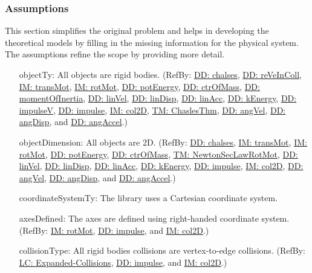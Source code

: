 \documentclass[12pt]{article}
\begin{document}
\subsubsection{Assumptions}
\label{Sec:Assumps}
This section simplifies the original problem and helps in developing the theoretical models by filling in the missing information for the physical system. The assumptions refine the scope by providing more detail.
\begin{itemize}
\item[objectTy:\phantomsection\label{assumpOT}]All objects are rigid bodies. (RefBy: \hyperref[DD:chalses]{DD: chalses}, \hyperref[DD:reVeInColl]{DD: reVeInColl}, \hyperref[IM:transMot]{IM: transMot}, \hyperref[IM:rotMot]{IM: rotMot}, \hyperref[DD:potEnergy]{DD: potEnergy}, \hyperref[DD:ctrOfMass]{DD: ctrOfMass}, \hyperref[DD:momentOfInertia]{DD: momentOfInertia}, \hyperref[DD:linVel]{DD: linVel}, \hyperref[DD:linDisp]{DD: linDisp}, \hyperref[DD:linAcc]{DD: linAcc}, \hyperref[DD:kEnergy]{DD: kEnergy}, \hyperref[DD:impulseV]{DD: impulseV}, \hyperref[DD:impulse]{DD: impulse}, \hyperref[IM:col2D]{IM: col2D}, \hyperref[TM:ChaslesThm]{TM: ChaslesThm}, \hyperref[DD:angVel]{DD: angVel}, \hyperref[DD:angDisp]{DD: angDisp}, and \hyperref[DD:angAccel]{DD: angAccel}.)
\item[objectDimension:\phantomsection\label{assumpOD}]All objects are 2D. (RefBy: \hyperref[DD:chalses]{DD: chalses}, \hyperref[IM:transMot]{IM: transMot}, \hyperref[IM:rotMot]{IM: rotMot}, \hyperref[DD:potEnergy]{DD: potEnergy}, \hyperref[DD:ctrOfMass]{DD: ctrOfMass}, \hyperref[TM:NewtonSecLawRotMot]{TM: NewtonSecLawRotMot}, \hyperref[DD:linVel]{DD: linVel}, \hyperref[DD:linDisp]{DD: linDisp}, \hyperref[DD:linAcc]{DD: linAcc}, \hyperref[DD:kEnergy]{DD: kEnergy}, \hyperref[DD:impulse]{DD: impulse}, \hyperref[IM:col2D]{IM: col2D}, \hyperref[DD:angVel]{DD: angVel}, \hyperref[DD:angDisp]{DD: angDisp}, and \hyperref[DD:angAccel]{DD: angAccel}.)
\item[coordinateSystemTy:\phantomsection\label{assumpCST}]The library uses a Cartesian coordinate system.
\item[axesDefined:\phantomsection\label{assumpAD}]The axes are defined using right-handed coordinate system. (RefBy: \hyperref[IM:rotMot]{IM: rotMot}, \hyperref[DD:impulse]{DD: impulse}, and \hyperref[IM:col2D]{IM: col2D}.)
\item[collisionType:\phantomsection\label{assumpCT}]All rigid bodies collisions are vertex-to-edge collisions. (RefBy: \hyperref[lcEC]{LC: Expanded-Collisions}, \hyperref[DD:impulse]{DD: impulse}, and \hyperref[IM:col2D]{IM: col2D}.)

\end{itemize}
\end{document}
